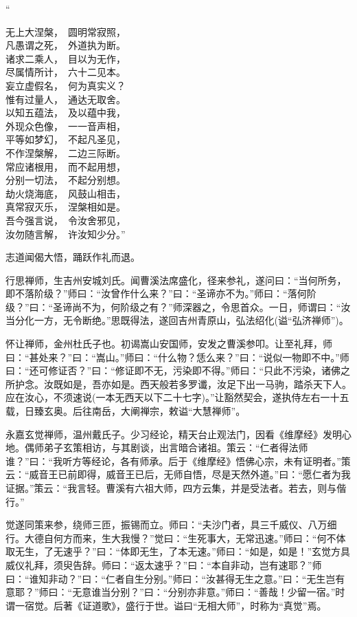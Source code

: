 \documentclass[UTF8, 11pt, oneside]{ctexart}
\newenvironment{jizi}[1]{
    \vspace{-1em}\begin{center}
        #1%
        \begin{varwidth}[t]{\linewidth}
}{
        \end{varwidth}
    \end{center}
}
\begin{document}
\begin{jizi}{“}
    无上大涅槃，　圆明常寂照， \\
    凡愚谓之死，　外道执为断。 \\
    诸求二乘人，　目以为无作， \\
    尽属情所计，　六十二见本。 \\
    妄立虚假名，　何为真实义？ \\
    惟有过量人，　通达无取舍。 \\
    以知五蕴法，　及以蕴中我， \\
    外现众色像，　一一音声相， \\
    平等如梦幻，　不起凡圣见， \\
    不作涅槃解，　二边三际断。 \\
    常应诸根用，　而不起用想， \\
    分别一切法，　不起分别想。 \\
    劫火烧海底，　风鼓山相击， \\
    真常寂灭乐，　涅槃相如是。 \\
    吾今强言说，　令汝舍邪见， \\
    汝勿随言解，　许汝知少分。”
\end{jizi}

志道闻偈大悟，踊跃作礼而退。

行思禅师，生吉州安城刘氏。闻曹溪法席盛化，径来参礼，遂问曰：“当何所务，即不落阶级？”师曰：“汝曾作什么来？”曰：“圣谛亦不为。”师曰：“落何阶级？”曰：“圣谛尚不为，何阶级之有？”师深器之，令思首众。一日，师谓曰：“汝当分化一方，无令断绝。”思既得法，遂回吉州青原山，弘法绍化(谥“弘济禅师”)。

怀让禅师，金州杜氏子也。初谒嵩山安国师，安发之曹溪参叩。让至礼拜，师曰：“甚处来？”曰：“嵩山。”师曰：“什么物？恁么来？”曰：“说似一物即不中。”师曰：“还可修证否？”曰：“修证即不无，污染即不得。”师曰：“只此不污染，诸佛之所护念。汝既如是，吾亦如是。西天般若多罗谶，汝足下出一马驹，踏杀天下人。应在汝心，不须速说(一本无西天以下二十七字)。”让豁然契会，遂执侍左右一十五载，日臻玄奥。后往南岳，大阐禅宗，敕谥“大慧禅师”。

永嘉玄觉禅师，温州戴氏子。少习经论，精天台止观法门，因看《维摩经》发明心地。偶师弟子玄策相访，与其剧谈，出言暗合诸祖。策云：“仁者得法师谁？”曰：“我听方等经论，各有师承。后于《维摩经》悟佛心宗，未有证明者。”策云：“威音王已前即得，威音王已后，无师自悟，尽是天然外道。”曰：“愿仁者为我证据。”策云：“我言轻。曹溪有六祖大师，四方云集，并是受法者。若去，则与偕行。”

觉遂同策来参，绕师三匝，振锡而立。师曰：“夫沙门者，具三千威仪、八万细行。大德自何方而来，生大我慢？”觉曰：“生死事大，无常迅速。”师曰：“何不体取无生，了无速乎？”曰：“体即无生，了本无速。”师曰：“如是，如是！”玄觉方具威仪礼拜，须臾告辞。师曰：“返太速乎？”曰：“本自非动，岂有速耶？”师曰：“谁知非动？”曰：“仁者自生分别。”师曰：“汝甚得无生之意。”曰：“无生岂有意耶？”师曰：“无意谁当分别？”曰：“分别亦非意。”师曰：“善哉！少留一宿。”时谓一宿觉。后著《证道歌》，盛行于世。谥曰“无相大师”，时称为“真觉”焉。
\end{document}
